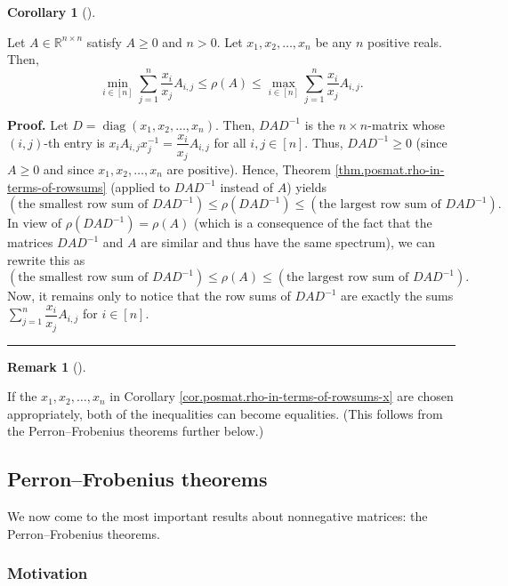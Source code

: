 \documentclass[numbers=enddot,12pt,final,onecolumn,notitlepage]{scrartcl}%
\numberwithin{exer}{subsection}
\theoremstyle{definition}
\newtheorem{remk}[theo]{Remark}
\newenvironment{remark}[1][]
{\begin{remk}[#1]\begin{leftbar}}
{\end{leftbar}\end{remk}}
\newtheorem{coro}[theo]{Corollary}
\newenvironment{corollary}[1][]
{\begin{coro}[#1]\begin{leftbar}}
{\end{leftbar}\end{coro}}
\newenvironment{proof}[1][Proof]{\noindent\textbf{#1.} }{\ \rule{0.5em}{0.5em}}
\let\sumnonlimits\sum
\renewcommand{\sum}{\sumnonlimits\limits}
\begin{document}
\begin{corollary}
\label{cor.posmat.rho-in-terms-of-rowsums-x}Let $A\in\mathbb{R}^{n\times n}$
satisfy $A\geq0$ and $n>0$. Let $x_{1},x_{2},\ldots,x_{n}$ be any $n$ positive
reals. Then,%
\[
\min\limits_{i\in\left[  n\right]  }\sum_{j=1}^{n}\dfrac{x_{i}}{x_{j}}%
A_{i,j}\leq\rho\left(  A\right)  \leq\max\limits_{i\in\left[  n\right]  }%
\sum_{j=1}^{n}\dfrac{x_{i}}{x_{j}}A_{i,j}.
\]

\end{corollary}

\begin{proof}
Let $D=\operatorname*{diag}\left(  x_{1},x_{2},\ldots,x_{n}\right)  $. Then,
$DAD^{-1}$ is the $n\times n$-matrix whose $\left(  i,j\right)  $-th entry is
$x_{i}A_{i,j}x_{j}^{-1}=\dfrac{x_{i}}{x_{j}}A_{i,j}$ for all $i,j\in\left[
n\right]  $. Thus, $DAD^{-1}\geq0$ (since $A\geq0$ and since $x_{1}%
,x_{2},\ldots,x_{n}$ are positive). Hence, Theorem
\ref{thm.posmat.rho-in-terms-of-rowsums} (applied to $DAD^{-1}$ instead of
$A$) yields%
\[
\left(  \text{the smallest row sum of }DAD^{-1}\right)  \leq\rho\left(
DAD^{-1}\right)  \leq\left(  \text{the largest row sum of }DAD^{-1}\right)  .
\]
In view of $\rho\left(  DAD^{-1}\right)  =\rho\left(  A\right)  $ (which is a
consequence of the fact that the matrices $DAD^{-1}$ and $A$ are similar and
thus have the same spectrum), we can rewrite this as
\[
\left(  \text{the smallest row sum of }DAD^{-1}\right)  \leq\rho\left(
A\right)  \leq\left(  \text{the largest row sum of }DAD^{-1}\right)  .
\]
Now, it remains only to notice that the row sums of $DAD^{-1}$ are exactly the
sums $\sum_{j=1}^{n}\dfrac{x_{i}}{x_{j}}A_{i,j}$ for $i\in\left[  n\right]  $.
\end{proof}

\begin{remark}
If the $x_{1},x_{2},\ldots,x_{n}$ in Corollary
\ref{cor.posmat.rho-in-terms-of-rowsums-x} are chosen appropriately, both of
the inequalities can become equalities. (This follows from the
Perron--Frobenius theorems further below.)
\end{remark}

\subsection{Perron--Frobenius theorems}

We now come to the most important results about nonnegative matrices: the
Perron--Frobenius theorems.

\subsubsection{Motivation}
\end{document}
